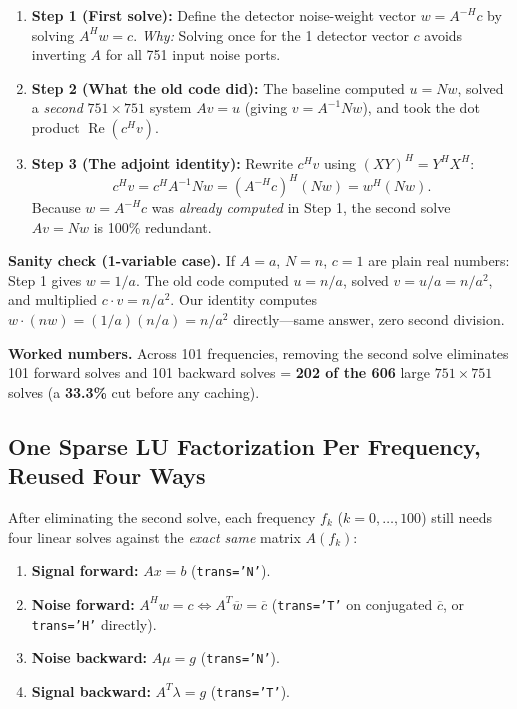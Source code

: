 \documentclass[11pt,a4paper]{article}
\begin{document}
\begin{enumerate}[leftmargin=1.6em,itemsep=3pt]
    \item \textbf{Step 1 (First solve):} Define the detector noise-weight vector $w = A^{-H} c$ by solving $A^H w = c$. \emph{Why:} Solving once for the 1 detector vector $c$ avoids inverting $A$ for all 751 input noise ports.
    \item \textbf{Step 2 (What the old code did):} The baseline computed $u = N w$, solved a \emph{second} $751\times 751$ system $A v = u$ (giving $v = A^{-1} N w$), and took the dot product $\operatorname{Re}(c^H v)$.
    \item \textbf{Step 3 (The adjoint identity):} Rewrite $c^H v$ using $(XY)^H = Y^H X^H$:
    \begin{equation}
    c^H v = c^H A^{-1} N w = \left(A^{-H} c\right)^H (N w) = w^H (N w).
    \end{equation}
    Because $w = A^{-H} c$ was \emph{already computed} in Step 1, the second solve $A v = N w$ is 100\% redundant.
\end{enumerate}

\textbf{Sanity check (1-variable case).} If $A = a$, $N = n$, $c = 1$ are plain real numbers: Step 1 gives $w = 1/a$. The old code computed $u = n/a$, solved $v = u/a = n/a^2$, and multiplied $c \cdot v = n/a^2$. Our identity computes $w \cdot (n w) = (1/a)(n/a) = n/a^2$ directly---same answer, zero second division.

\textbf{Worked numbers.} Across 101 frequencies, removing the second solve eliminates 101 forward solves and 101 backward solves = \textbf{202 of the 606} large $751\times 751$ solves (a \textbf{33.3\%} cut before any caching).

\subsection{One Sparse LU Factorization Per Frequency, Reused Four Ways}

After eliminating the second solve, each frequency $f_k$ ($k = 0,\dots,100$) still needs four linear solves against the \emph{exact same} matrix $A(f_k)$:
\begin{enumerate}[leftmargin=1.6em,itemsep=2pt]
    \item \textbf{Signal forward:} $A x = b$ (\texttt{trans='N'}).
    \item \textbf{Noise forward:} $A^H w = c \iff A^T \overline{w} = \overline{c}$ (\texttt{trans='T'} on conjugated $\overline{c}$, or \texttt{trans='H'} directly).
    \item \textbf{Noise backward:} $A \mu = g$ (\texttt{trans='N'}).
    \item \textbf{Signal backward:} $A^T \lambda = g$ (\texttt{trans='T'}).
\end{enumerate}
\end{document}
